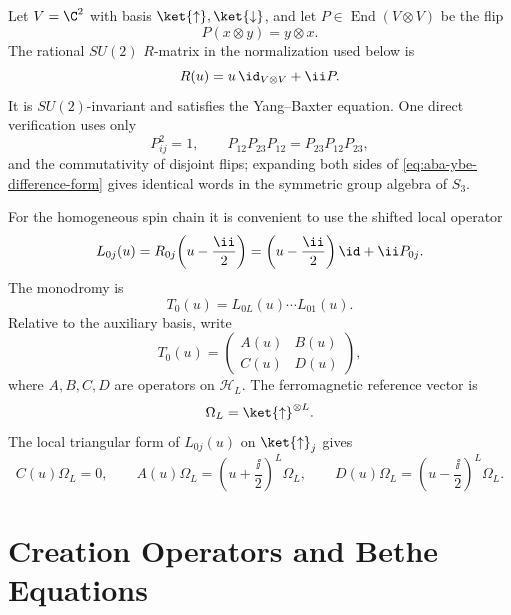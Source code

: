 Let \(V=\C^2\) with basis \(\ket{\uparrow},\ket{\downarrow}\), and let
\(P\in\operatorname{End}(V\otimes V)\) be the flip
\[
  P(x\otimes y)=y\otimes x .
\]
The rational \(SU(2)\) \(R\)-matrix in the normalization used below is
\[
  R(u)=u\,\id_{V\otimes V}+\ii P .
\]
It is \(SU(2)\)-invariant and satisfies the Yang--Baxter equation.  One direct
verification uses only
\[
  P_{ij}^2=1,\qquad
  P_{12}P_{23}P_{12}=P_{23}P_{12}P_{23},
\]
and the commutativity of disjoint flips; expanding both sides of
\eqref{eq:aba-ybe-difference-form} gives identical words in the symmetric
group algebra of \(S_3\).

For the homogeneous spin chain it is convenient to use the shifted local
operator
\[
  L_{0j}(u)=R_{0j}\!\left(u-\frac{\ii}{2}\right)
  =
  \left(u-\frac{\ii}{2}\right)\id+\ii P_{0j}.
\]
The monodromy is
\[
  T_0(u)=L_{0L}(u)\cdots L_{01}(u).
\]
Relative to the auxiliary basis, write
\[
  T_0(u)
  =
  \begin{pmatrix}
    A(u) & B(u) \\
    C(u) & D(u)
  \end{pmatrix},
\]
where \(A,B,C,D\) are operators on \(\mathcal H_L\).  The ferromagnetic
reference vector is
\[
  \Omega_L=\ket{\uparrow}^{\otimes L}.
\]
The local triangular form of \(L_{0j}(u)\) on
\(\ket{\uparrow}_j\) gives
\[
  C(u)\Omega_L=0,\qquad
  A(u)\Omega_L=\left(u+\frac{\ii}{2}\right)^L\Omega_L,\qquad
  D(u)\Omega_L=\left(u-\frac{\ii}{2}\right)^L\Omega_L .
\]

\section{Creation Operators and Bethe Equations}

